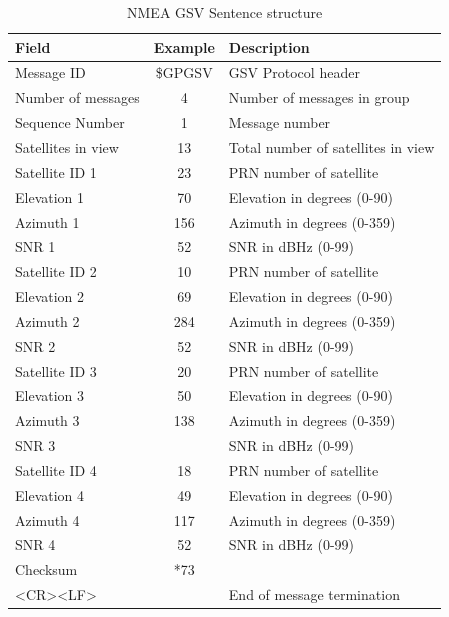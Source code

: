 \renewcommand{\arraystretch}{1.5}
\begin{table}[!h]
    \begin{center}
        \caption{NMEA GSV Sentence structure}
        \label{tab:NMEA GSV Struct}
        \begin{tabular}{ |m{4cm}|c|p{6cm}| }
            \hline
            \textbf{Field} & \textbf{Example} & \textbf{Description} \\
            \hline
            Message ID & \$GPGSV & GSV Protocol header \\
            \hline
            Number of messages & 4 & Number of messages in group \\
            \hline
            Sequence Number & 1 & Message number \\
            \hline
            Satellites in view & 13 & Total number of satellites in view\\
            \hline
            Satellite ID 1 & 23 & PRN number of satellite \\
            \hline
            Elevation 1 & 70 & Elevation in degrees (0-90)\\
            \hline
            Azimuth 1 & 156 & Azimuth in degrees (0-359)\\
            \hline
            SNR 1 & 52 & SNR in dBHz (0-99)\\
            \hline
            Satellite ID 2 & 10 & PRN number of satellite \\
            \hline
            Elevation 2 & 69 & Elevation in degrees (0-90)\\
            \hline
            Azimuth 2 & 284 & Azimuth in degrees (0-359)\\
            \hline
            SNR 2 & 52 & SNR in dBHz (0-99)\\
            \hline
            Satellite ID 3 & 20 & PRN number of satellite \\
            \hline
            Elevation 3 & 50 & Elevation in degrees (0-90)\\
            \hline
            Azimuth 3 & 138 & Azimuth in degrees (0-359)\\
            \hline
            SNR 3 &  & SNR in dBHz (0-99)\\
            \hline
            Satellite ID 4 & 18 & PRN number of satellite \\
            \hline
            Elevation 4 & 49 & Elevation in degrees (0-90)\\
            \hline
            Azimuth 4 & 117 & Azimuth in degrees (0-359)\\
            \hline
            SNR 4 & 52 & SNR in dBHz (0-99)\\
            \hline
            Checksum & *73 &  \\
            \hline
            <CR><LF> & & End of message termination \\
            \hline
        \end{tabular}
    \end{center}
\end{table}
\renewcommand{\arraystretch}{1}

